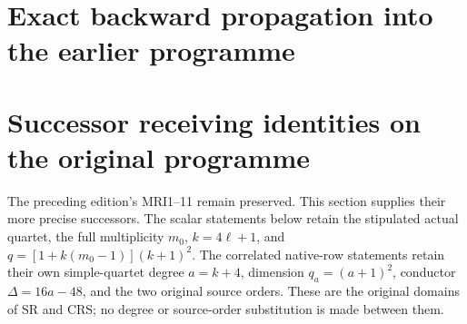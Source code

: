 \documentclass[11pt,a4paper]{article}
\begin{document}
\endgroup

\clearpage
\begingroup


\setcounter{equation}{0}
\renewcommand{\theequation}{A02ARU.\arabic{equation}}
\section*{Exact backward propagation into the earlier programme}
\section{Successor receiving identities on the original programme}

The preceding edition's MRI1--11 remain preserved. This section supplies
their more precise successors. The scalar statements below retain the
stipulated actual quartet, the full multiplicity $m_0$, $k=4\ell+1$, and
$q=[1+k(m_0-1)](k+1)^2$. The correlated native-row statements retain their
own simple-quartet degree $a=k+4$, dimension $q_a=(a+1)^2$, conductor
$\Delta=16a-48$, and the two original source orders. These are the
original domains of SR and CRS; no degree or source-order substitution
is made between them.
\end{document}
